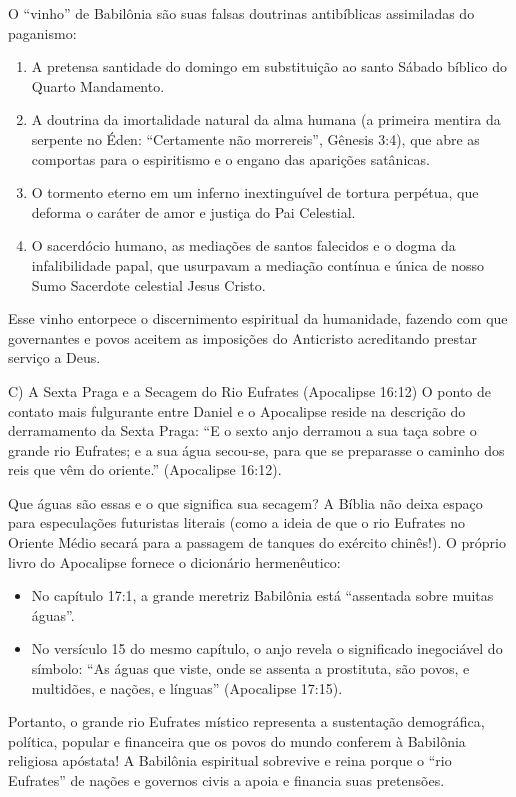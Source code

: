 O ``vinho'' de Babilônia são suas falsas doutrinas antibíblicas assimiladas do paganismo:
\begin{enumerate}
  \item A pretensa santidade do domingo em substituição ao santo Sábado bíblico do Quarto Mandamento.
  \item A doutrina da imortalidade natural da alma humana (a primeira mentira da serpente no Éden: ``Certamente não morrereis'', Gênesis 3:4), que abre as comportas para o espiritismo e o engano das aparições satânicas.
  \item O tormento eterno em um inferno inextinguível de tortura perpétua, que deforma o caráter de amor e justiça do Pai Celestial.
  \item O sacerdócio humano, as mediações de santos falecidos e o dogma da infalibilidade papal, que usurpavam a mediação contínua e única de nosso Sumo Sacerdote celestial Jesus Cristo.
\end{enumerate}


Esse vinho entorpece o discernimento espiritual da humanidade, fazendo com que governantes e povos aceitem as imposições do Anticristo acreditando prestar serviço a Deus.

C) A Sexta Praga e a Secagem do Rio Eufrates (Apocalipse 16:12)
O ponto de contato mais fulgurante entre Daniel e o Apocalipse reside na descrição do derramamento da Sexta Praga:
``E o sexto anjo derramou a sua taça sobre o grande rio Eufrates; e a sua água secou-se, para que se preparasse o caminho dos reis que vêm do oriente.'' (Apocalipse 16:12).

Que águas são essas e o que significa sua secagem?
A Bíblia não deixa espaço para especulações futuristas literais (como a ideia de que o rio Eufrates no Oriente Médio secará para a passagem de tanques do exército chinês!). O próprio livro do Apocalipse fornece o dicionário hermenêutico:
\begin{itemize}
  \item No capítulo 17:1, a grande meretriz Babilônia está ``assentada sobre muitas águas''.
  \item No versículo 15 do mesmo capítulo, o anjo revela o significado inegociável do símbolo: ``As águas que viste, onde se assenta a prostituta, são povos, e multidões, e nações, e línguas'' (Apocalipse 17:15).
\end{itemize}


Portanto, o grande rio Eufrates místico representa a sustentação demográfica, política, popular e financeira que os povos do mundo conferem à Babilônia religiosa apóstata! A Babilônia espiritual sobrevive e reina porque o ``rio Eufrates'' de nações e governos civis a apoia e financia suas pretensões.

